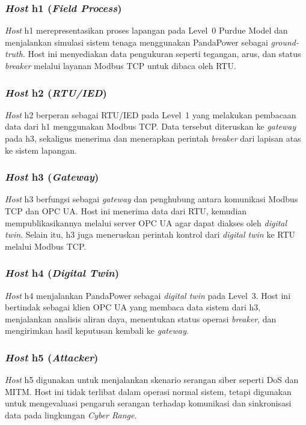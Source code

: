 \subsubsection*{\textit{Host} h1 (\textit{Field Process})}
\textit{Host} h1 merepresentasikan proses lapangan pada Level~0 Purdue Model dan menjalankan simulasi sistem tenaga menggunakan PandaPower sebagai \textit{ground-truth}. Host ini menyediakan data pengukuran seperti tegangan, arus, dan status \textit{breaker} melalui layanan Modbus TCP untuk dibaca oleh RTU.

\subsubsection*{\textit{Host} h2 (\textit{RTU/IED})}
\textit{Host} h2 berperan sebagai RTU/IED pada Level~1 yang melakukan pembacaan data dari h1 menggunakan Modbus TCP. Data tersebut diteruskan ke \textit{gateway} pada h3, sekaligus menerima dan menerapkan perintah \textit{breaker} dari lapisan atas ke sistem lapangan.

\subsubsection*{\textit{Host} h3 (\textit{Gateway})}
\textit{Host} h3 berfungsi sebagai \textit{gateway} dan penghubung antara komunikasi Modbus TCP dan OPC UA. Host ini menerima data dari RTU, kemudian mempublikasikannya melalui server OPC UA agar dapat diakses oleh \textit{digital twin}. Selain itu, h3 juga meneruskan perintah kontrol dari \textit{digital twin} ke RTU melalui Modbus TCP.

\subsubsection*{\textit{Host} h4 (\textit{Digital Twin})}
\textit{Host} h4 menjalankan PandaPower sebagai \textit{digital twin} pada Level~3. Host ini bertindak sebagai klien OPC UA yang membaca data sistem dari h3, menjalankan analisis aliran daya, menentukan status operasi \textit{breaker}, dan mengirimkan hasil keputusan kembali ke \textit{gateway}.

\subsubsection*{\textit{Host} h5 (\textit{Attacker})}
\textit{Host} h5 digunakan untuk menjalankan skenario serangan siber seperti \ac{DoS} dan \ac{MITM}. Host ini tidak terlibat dalam operasi normal sistem, tetapi digunakan untuk mengevaluasi pengaruh serangan terhadap komunikasi dan sinkronisasi data pada lingkungan \textit{Cyber Range}.

